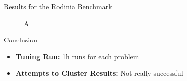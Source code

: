 \documentclass{beamer}
\begin{document}
\begin{frame}
\begin{columns}[t]
\begin{column}{.46\linewidth}
\begin{block}{\Large Results for the Rodinia Benchmark}
\begin{figure}[htpb]
                \caption{A}
            \end{figure}
        \end{block}
        \begin{block}{\Large Conclusion}
            \large
            \begin{itemize}
                \item \textbf{Tuning Run:} 1h runs for each problem
                \item \textbf{Attempts to Cluster Results:} Not really successful
            \end{itemize}
        \end{block}
    \end{column}
\end{columns}
\end{frame}
\end{document}
